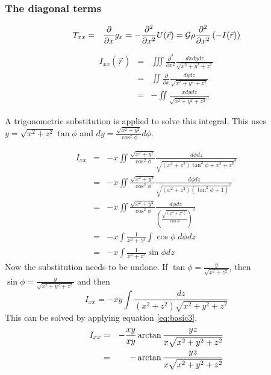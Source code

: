 \subsubsection{The diagonal terms}

\begin{eqnarray}
T_{xx} 
&=& \frac{\partial}{\partial x} g_x 
= -\frac{\partial^2}{\partial x^2} U(\vec{r}) 
= {\cal G} \rho \frac{\partial^2}{\partial x^2} \left( -I(\vec{r}) \right)
\end{eqnarray}

\begin{eqnarray}
I_{xx}(\vec{r}) 
&=& \iiint \frac{\partial^2}{\partial x^2} \frac{dx dy dz}{\sqrt{x^2+y^2+z^2}} \nonumber\\
&=& \iint \frac{\partial}{\partial x} \frac{dy dz}{\sqrt{x^2+y^2+z^2}} \nonumber\\
&=& - \iint \frac{x dy dz}{\sqrt{x^2+y^2+z^2}^3}
\end{eqnarray}

A trigonometric substitution is applied to solve this integral. 
This uses $y = \sqrt{x^2+z^2}\tan{\phi}$ and $dy = \frac{\sqrt{x^2+y^2}}{\cos^2{\phi}}d\phi$.

\begin{eqnarray}
I_{xx} 
&=& -x \iint \frac{\sqrt{x^2+y^2}}{\cos^2{\phi}} 
\frac{d\phi dz}{\sqrt{(x^2+z^2)\tan^2{\phi}+x^2+z^2}^3} \nonumber\\
&=& -x \iint \frac{\sqrt{x^2+y^2}}{\cos^2{\phi}} 
\frac{d\phi dz}{\sqrt{(x^2+z^2)(\tan^2{\phi}+1)}^3} \nonumber\\
&=& -x \iint \frac{\sqrt{x^2+y^2}}{\cos^2{\phi}} 
\frac{d\phi dz}{\left( \frac{\sqrt{(x^2+z^2)}}{\cos{\phi}} \right)^3} \nonumber\\
&=& -x \int \frac{1}{x^2+z^2} \int \cos{\phi} \; d\phi dz \nonumber\\
&=& -x \int \frac{1}{x^2+z^2} \sin{\phi} dz
\end{eqnarray}
Now the substitution needs to be undone. If $\tan{\phi} = \frac{y}{\sqrt{x^2+z^2}}$, then $\sin{\phi} = \frac{y}{\sqrt{x^2+y^2+z^2}}$ and then
\begin{equation}
I_{xx} = -xy \int \frac{dz}{(x^2+z^2)\sqrt{x^2+y^2+z^2}}
\end{equation}
This can be solved by applying equation \eqref{eq:basic3}.
\begin{eqnarray}
I_{xx} 
&=& -\frac{xy}{xy} \arctan{\frac{yz}{x\sqrt{x^2+y^2+z^2}}} \nonumber\\
&=& -\arctan{\frac{y z}{x \sqrt{x^2+y^2+z^2}}} \nonumber
\end{eqnarray}

